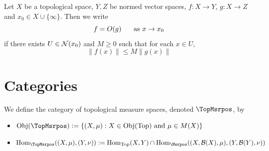 \documentclass{book}
\begin{document}
\begin{defn} \ld{}
	Let $X$ be a topological space, $Y, Z$ be normed vector spaces, $f:X \rightarrow Y$, $g: X \rightarrow Z$ and $x_0 \in X \cup \{\infty\}$. Then we write $$f = O(g) \hspace{.5cm} \text{ as } x \rightarrow x_0$$ if there exists $U \in \mathcal{N}(x_0)$ and $M \geq 0$ such that for each $x \in U$, $$\|f(x)\| \leq M\|g(x)\|$$
\end{defn}



























\newpage
\chapter{Categories}


\begin{defn}
	We define the category of topological measure spaces, denoted $\TopMsrpos$, by 
	\begin{itemize}
		\item $\Obj(\TopMsrpos) \defeq \{(X, \mu): X \in \Obj(\Top) \text{ and } \mu \in M(X)\}$			
		\item $\Hom_{\TopMsrpos}((X, \mu), (Y, \nu)) \defeq \Hom_{\Top}(X, Y) \cap \Hom_{\Msrpos}((X, \MB(X), \mu), (Y, \MB(Y), \nu))$
	\end{itemize}
\end{defn}
\end{document}
